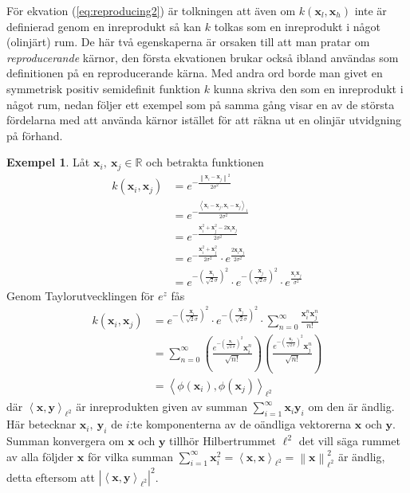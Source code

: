 \documentclass[a4paper, 12pt]{report}
\theoremstyle{definition}
\newtheorem{ex}{Exempel}[section]
\theoremstyle{remark}
\newcommand{\bfx}{\mathbf{x}}
\newcommand{\bfy}{\mathbf{y}}
\newcommand{\llangle}{\left\langle}
\newcommand{\rrangle}{\right\rangle}
\newcommand{\inner}[2]{\llangle #1, #2 \rrangle}
\begin{document}
För ekvation (\ref{eq:reproducing2}) är tolkningen att även om $k\left(\bfx_l, \bfx_h\right)$ inte är definierad genom en inreprodukt så kan $k$ tolkas som en inreprodukt i något (olinjärt) rum. De här två egenskaperna är orsaken till att man pratar om \emph{reproducerande} kärnor, den första ekvationen brukar också ibland användas som definitionen på en reproducerande kärna. Med andra ord borde man givet en symmetrisk positiv semidefinit funktion $k$ kunna skriva den som en inreprodukt i något rum, nedan följer ett exempel som på samma gång visar en av de största fördelarna med att använda kärnor istället för att räkna ut en olinjär utvidgning på förhand.

\begin{ex}
	Låt $\bfx_i,~\bfx_j\in\mathbb{R}$ och betrakta funktionen
	\begin{align*}
		k\left(\bfx_i,\bfx_j\right)&=e^{-\frac{\left\| \bfx_i-\bfx_j\right\|^2}{2\sigma^2}}\\&=e^{-\frac{\inner{\bfx_i-\bfx_j}{\bfx_i-\bfx_j}_1}{2\sigma^2}}\\
		&=e^{-\frac{\bfx_i^2+\bfx_j^2-2\bfx_i\bfx_j}{2\sigma^2}}\\&=e^{-\frac{\bfx_i^2+\bfx_j^2}{2\sigma^2}}\cdot e^{\frac{2\bfx_i\bfx_j}{2\sigma^2}}\\
		&= e^{-\left(\frac{\bfx_i}{\sqrt{2}\sigma}\right)^2}\cdot e^{-\left(\frac{\bfx_j}{\sqrt{2}\sigma}\right)^2}\cdot e^{\frac{\bfx_i\bfx_j}{\sigma^2}}
	\end{align*}
	Genom Taylorutvecklingen för $e^{z}$ fås
	\begin{align*}
		k\left(\bfx_i,\bfx_j\right)&= e^{-\left(\frac{\bfx_i}{\sqrt{2}\sigma}\right)^2}\cdot e^{-\left(\frac{\bfx_j}{\sqrt{2}\sigma}\right)^2}\cdot \sum_{n=0}^{\infty}\frac{\bfx_i^n\bfx_j^n}{n!}\\
		&= \sum_{n=0}^{\infty} \left(\frac{e^{-\left(\frac{\bfx_i}{\sqrt{2}\sigma}\right)^2} \bfx_i^n}{\sqrt{n!}}\right)\left(\frac{e^{-\left(\frac{\bfx_j}{\sqrt{2}\sigma}\right)^2} \bfx_j^n}{\sqrt{n!}}\right)\\
		&= \inner{\phi\left(\bfx_i\right)}{\phi\left(\bfx_j\right)}_{\ell^2}
	\end{align*}
	där $\inner{\bfx}{\bfy}_{\ell^2}$ är inreprodukten given av summan $\sum_{i=1}^{\infty}\bfx_i\bfy_i$ om den är ändlig. Här betecknar $\bfx_i,~\bfy_i$ de $i$:te komponenterna av de oändliga vektorerna $\bfx$ och $\bfy$. Summan konvergera om $\bfx$ och $\bfy$ tillhör Hilbertrummet $\ell^2$ det vill säga rummet av alla följder $\bfx$ för vilka summan $\sum_{i=1}^{\infty}\bfx_i^2=\inner{\bfx}{\bfx}_{\ell^2}=\left\|\bfx\right\|_{\ell^2}^2$ är ändlig, detta eftersom att $|\inner{\bfx}{\bfy}_{\ell^2}|^2$.
	

\end{ex}
\end{document}
